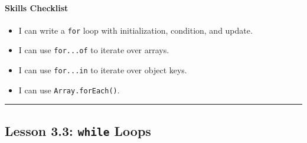 \documentclass[
  justified,
  openright,
]{tufte-book}
\let\subsubsection\paragraph
\let\paragraph\paragraph
\newcommand{\BuiltInTok}[1]{#1}
\newcommand{\CommentTok}[1]{\textcolor{MidGray}{#1}}
\newcommand{\ControlFlowTok}[1]{\textcolor{BrandBlue}{#1}}
\newcommand{\DecValTok}[1]{\textcolor{Purple}{#1}}
\newcommand{\FunctionTok}[1]{\textcolor{BrandBlue}{#1}}
\newcommand{\KeywordTok}[1]{\textcolor{BrandBlue}{#1}}
\newcommand{\NormalTok}[1]{#1}
\newcommand{\OperatorTok}[1]{\textcolor{DarkGray}{#1}}
\newcommand{\SpecialCharTok}[1]{\textcolor{Teal}{#1}}
\newcommand{\VerbatimStringTok}[1]{\textcolor{Teal}{#1}}
\newenvironment{Shaded}{%
  \begin{snugshade}
}{%
  \end{snugshade}
}
\let\subsubsection\paragraph
\let\paragraph\paragraph
\providecommand{\tightlist}{%
  \setlength{\itemsep}{0pt}\setlength{\parskip}{0pt}}
\begin{document}
\subsubsection{Skills Checklist}\label{skills-checklist-6}

\begin{itemize}
\tightlist
\item[$\square$]
  I can write a \texttt{for} loop with initialization, condition, and
  update.
\item[$\square$]
  I can use \texttt{for...of} to iterate over arrays.
\item[$\square$]
  I can use \texttt{for...in} to iterate over object keys.
\item[$\square$]
  I can use \texttt{Array.forEach()}.
\end{itemize}

\begin{center}\rule{0.5\linewidth}{0.5pt}\end{center}

\subsection{\texorpdfstring{Lesson 3.3: \texttt{while}
Loops}{Lesson 3.3: while Loops}}\label{lesson-3.3-while-loops}

\begin{Shaded}
\end{Shaded}
\end{document}
